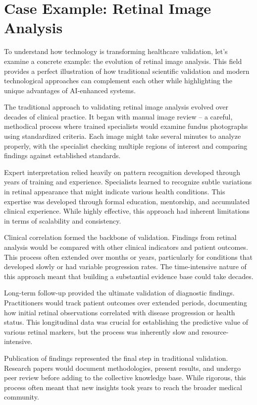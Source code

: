 \documentclass[
  Letterpaper,
]{scrbook}
\begin{document}
\section{Case Example: Retinal Image
Analysis}\label{case-example-retinal-image-analysis}

To understand how technology is transforming healthcare validation,
let's examine a concrete example: the evolution of retinal image
analysis. This field provides a perfect illustration of how traditional
scientific validation and modern technological approaches can complement
each other while highlighting the unique advantages of AI-enhanced
systems.

The traditional approach to validating retinal image analysis evolved
over decades of clinical practice. It began with manual image review --
a careful, methodical process where trained specialists would examine
fundus photographs using standardized criteria. Each image might take
several minutes to analyze properly, with the specialist checking
multiple regions of interest and comparing findings against established
standards.

Expert interpretation relied heavily on pattern recognition developed
through years of training and experience. Specialists learned to
recognize subtle variations in retinal appearance that might indicate
various health conditions. This expertise was developed through formal
education, mentorship, and accumulated clinical experience. While highly
effective, this approach had inherent limitations in terms of
scalability and consistency.

Clinical correlation formed the backbone of validation. Findings from
retinal analysis would be compared with other clinical indicators and
patient outcomes. This process often extended over months or years,
particularly for conditions that developed slowly or had variable
progression rates. The time-intensive nature of this approach meant that
building a substantial evidence base could take decades.

Long-term follow-up provided the ultimate validation of diagnostic
findings. Practitioners would track patient outcomes over extended
periods, documenting how initial retinal observations correlated with
disease progression or health status. This longitudinal data was crucial
for establishing the predictive value of various retinal markers, but
the process was inherently slow and resource-intensive.

Publication of findings represented the final step in traditional
validation. Research papers would document methodologies, present
results, and undergo peer review before adding to the collective
knowledge base. While rigorous, this process often meant that new
insights took years to reach the broader medical community.
\end{document}
